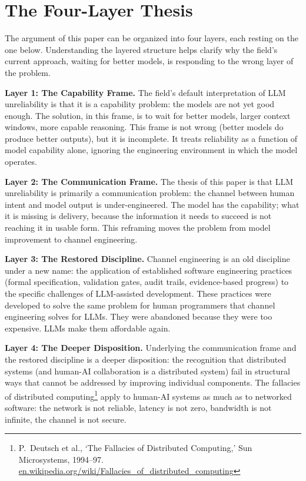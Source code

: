 \documentclass[11pt, a4paper]{article}
\begin{document}
\section{The Four-Layer Thesis}

The argument of this paper can be organized into four layers, each resting on the one
below. Understanding the layered structure helps clarify why the field's current
approach, waiting for better models, is responding to the wrong layer of the problem.

\textbf{Layer 1: The Capability Frame.} The field's default interpretation of LLM
unreliability is that it is a capability problem: the models are not yet good enough. The
solution, in this frame, is to wait for better models, larger context windows, more
capable reasoning. This frame is not wrong (better models do produce better
outputs), but it is incomplete. It treats reliability as a function of model capability
alone, ignoring the engineering environment in which the model operates.

\textbf{Layer 2: The Communication Frame.} The thesis of this paper is that LLM
unreliability is primarily a communication problem: the channel between human intent and
model output is under-engineered. The model has the capability; what it is missing is
delivery, because the information it needs to succeed is not reaching it in usable form.
This reframing moves the problem from model improvement to channel
engineering.

\textbf{Layer 3: The Restored Discipline.} Channel engineering is an old discipline
under a new name: the application of established software engineering practices (formal
specification, validation gates, audit trails, evidence-based progress) to the specific
challenges of LLM-assisted development. These practices were developed to solve the same
problem for human programmers that channel engineering solves for LLMs. They were
abandoned because they were too expensive. LLMs make them affordable again.

\textbf{Layer 4: The Deeper Disposition.} Underlying the communication frame and the
restored discipline is a deeper disposition: the recognition that distributed
systems (and human-AI collaboration is a distributed system) fail in structural ways
that cannot be addressed by improving individual components. The fallacies of distributed
computing\footnote{P.~Deutsch et al., `The Fallacies of Distributed Computing,' Sun Microsystems,
1994--97.
\href{https://en.wikipedia.org/wiki/Fallacies_of_distributed_computing}{en.wikipedia.org/wiki/Fallacies\_of\_distributed\_computing}}
apply to human-AI systems as much as to networked software: the network is not reliable,
latency is not zero, bandwidth is not infinite, the channel is not secure.
\end{document}
